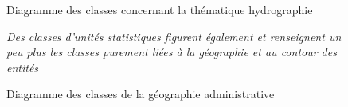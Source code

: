 \documentclass{themeensg}
\begin{document}
\begin{appendices}
\addtocounter{figure}{-1}
\begin{figure}
\addtocounter{figure}{1}
\centering
{}%
\caption{Diagramme des classes concernant la thématique hydrographie}
\end{figure}

\addtocounter{figure}{-1}
\begin{figure}
\addtocounter{figure}{1}
\centering
{}%
\caption{Diagramme des classes de la géographie administrative}%
\textit{Des classes d'unités statistiques figurent également et renseignent un peu plus les classes purement liées à la géographie et au contour des entités}
\end{figure}


\end{appendices}
\end{document}
